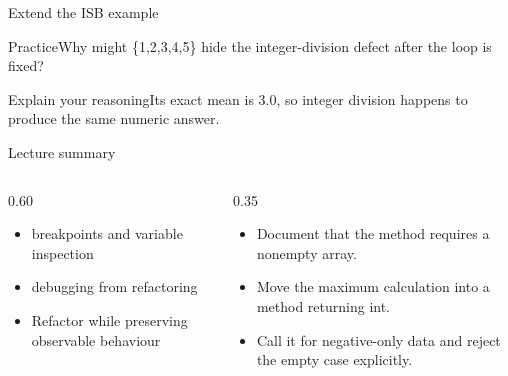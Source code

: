 \documentclass[10pt,aspectratio=169]{beamer}
\begin{document}
\begin{frame}[fragile,t]{Extend the ISB example}
\begin{alertblock}{Practice}Why might \{1,2,3,4,5\} hide the integer{-}division defect after the loop is fixed?\end{alertblock}\vspace{3mm}\begin{exampleblock}{Explain your reasoning}Its exact mean is 3.0, so integer division happens to produce the same numeric answer.\end{exampleblock}
\end{frame}
\begin{frame}[fragile,t]{Lecture summary}
\begin{columns}[T,onlytextwidth]\begin{column}{0.60\textwidth}
\begin{itemize}
\item breakpoints and variable inspection
\item debugging from refactoring
\item Refactor while preserving observable behaviour
\end{itemize}
\end{column}\begin{column}{0.35\textwidth}\small
\begin{itemize}
\item Document that the method requires a nonempty array.
\item Move the maximum calculation into a method returning int.
\item Call it for negative-only data and reject the empty case explicitly.
\end{itemize}
\end{column}\end{columns}
\end{frame}
\end{document}
